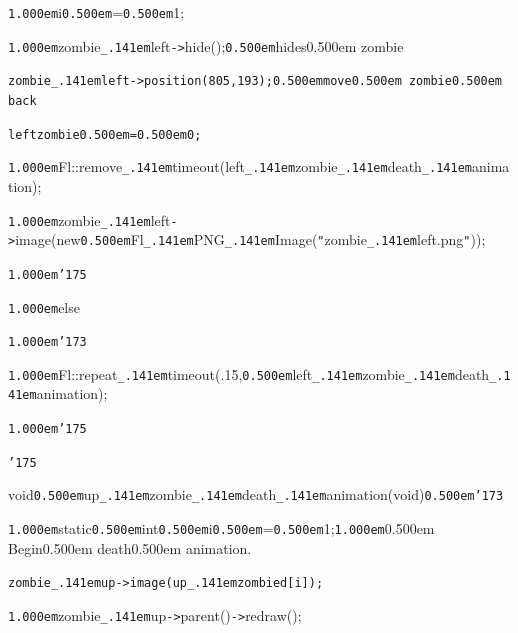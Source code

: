 \documentclass[12pt]{article}
\begin{document}
\noindent
\tt{}

\noindent
{}{\tt\mc \kern1.000em}i{\tt\mc \kern0.500em}={\tt\mc \kern0.500em}1;

\noindent
{}{\tt\mc \kern1.000em}zombie{\tt\_\kern.141em}left{\tt -}{\tt >}hide();{\tt\mc \kern0.500em}\rm\mc {\tt /}{\tt /}hides\kern0.500em zombie

\noindent
\tt\mc {\tt\mc \kern1.000em}zombie{\tt\_\kern.141em}left{\tt -}{\tt >}position(805,193);{\tt\mc \kern0.500em}\rm\mc {\tt /}{\tt /}move\kern0.500em zombie\kern0.500em back

\noindent
\tt\mc {\tt\mc \kern1.000em}leftzombie{\tt\mc \kern0.500em}={\tt\mc \kern0.500em}0;

\noindent
{}{\tt\mc \kern1.000em}Fl::remove{\tt\_\kern.141em}timeout(left{\tt\_\kern.141em}zombie{\tt\_\kern.141em}death{\tt\_\kern.141em}animation);

\noindent
{}{\tt\mc \kern1.000em}zombie{\tt\_\kern.141em}left{\tt -}{\tt >}image(new{\tt\mc \kern0.500em}Fl{\tt\_\kern.141em}PNG{\tt\_\kern.141em}Image({\tt "}zombie{\tt\_\kern.141em}left.png{\tt "}));

\noindent
{}{\tt\mc \kern1.000em}{\tt\char'175}

\noindent
{}{\tt\mc \kern1.000em}else

\noindent
{}{\tt\mc \kern1.000em}{\tt\char'173}

\noindent
{}{\tt\mc \kern1.000em}Fl::repeat{\tt\_\kern.141em}timeout(.15,{\tt\mc \kern0.500em}left{\tt\_\kern.141em}zombie{\tt\_\kern.141em}death{\tt\_\kern.141em}animation);

\noindent
{}{\tt\mc \kern1.000em}{\tt\char'175}

\noindent
{}{\tt\char'175}

\noindent
{}\hfill

\noindent
{}void{\tt\mc \kern0.500em}up{\tt\_\kern.141em}zombie{\tt\_\kern.141em}death{\tt\_\kern.141em}animation(void{\tt *}){\tt\mc \kern0.500em}{\tt\char'173}

\noindent
{}{\tt\mc \kern1.000em}static{\tt\mc \kern0.500em}int{\tt\mc \kern0.500em}i{\tt\mc \kern0.500em}={\tt\mc \kern0.500em}1;{\tt\mc \kern1.000em}\rm\mc {\tt /}{\tt /}\kern0.500em Begin\kern0.500em death\kern0.500em animation.

\noindent
\tt\mc {\tt\mc \kern1.000em}zombie{\tt\_\kern.141em}up{\tt -}{\tt >}image(up{\tt\_\kern.141em}zombied[i]);

\noindent
{}{\tt\mc \kern1.000em}zombie{\tt\_\kern.141em}up{\tt -}{\tt >}parent(){\tt -}{\tt >}redraw();
\end{document}
